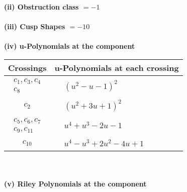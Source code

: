 \documentclass[1p]{elsarticle_modified}
\theoremstyle{definition}
\begin{document}
\flushleft \textbf{(ii) Obstruction class $= -1$}\\~\\
\flushleft \textbf{(iii) Cusp Shapes $= -10$}\\~\\
\newpage\renewcommand{\arraystretch}{1}
\flushleft \textbf{(iv) u-Polynomials at the component}\newline \\
\begin{tabular}{m{50pt}|m{274pt}}
Crossings & \hspace{64pt}u-Polynomials at each crossing \\
\hline $$\begin{aligned}c_{1},c_{3},c_{4}\\c_{8}\end{aligned}$$&$\begin{aligned}
&(u^2- u-1)^2
\end{aligned}$\\
\hline $$\begin{aligned}c_{2}\end{aligned}$$&$\begin{aligned}
&(u^2+3 u+1)^2
\end{aligned}$\\
\hline $$\begin{aligned}c_{5},c_{6},c_{7}\\c_{9},c_{11}\end{aligned}$$&$\begin{aligned}
&u^4+u^3-2 u-1
\end{aligned}$\\
\hline $$\begin{aligned}c_{10}\end{aligned}$$&$\begin{aligned}
&u^4- u^3+2 u^2-4 u+1
\end{aligned}$\\
\hline
\end{tabular}\\~\\
\newpage\renewcommand{\arraystretch}{1}
\flushleft \textbf{(v) Riley Polynomials at the component}\newline \\
\end{document}
